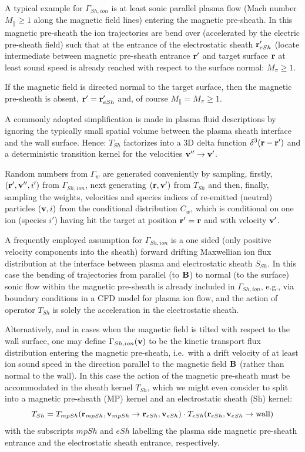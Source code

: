 A typical example for $\Gamma_{Sh,ion}$ is at least sonic parallel plasma flow
(Mach number $M_\|\geq 1$ along the magnetic field lines) entering the magnetic
pre-sheath.
In this magnetic pre-sheath the ion trajectories are bend over (accelerated by
the electric pre-sheath field) such that at the entrance of the electrostatic
sheath $\mathbf{r}'_{eSh}$ (locate intermediate between magnetic pre-sheath entrance
$\mathbf{r} '$ and target surface $\mathbf{r}$ at least sound speed is already reached with
respect to the surface normal: $M_\pi\geq 1$.

If the magnetic field is directed normal to the target surface, then the
magnetic pre-sheath is absent, $\mathbf{r}' = \mathbf{r}'_{eSh}$  and, of course $M_\| =
  M_\pi \geq 1$.

A commonly adopted simplification is made in plasma fluid descriptions by
ignoring the typically small spatial volume between the plasma sheath interface
and the wall surface.
Hence: $T_{Sh}$ factorizes into a 3D delta function $\delta^3(\mathbf{r}-\mathbf{r}')$ and a
deterministic transition kernel for the velocities $\mathbf{v}'' \rightarrow \mathbf{v}'$.

Random numbers from $\Gamma_w$ are generated conveniently by sampling, firstly,
$(\mathbf{r} ', \mathbf{v}  '', i ' ) $ from $\Gamma_{Sh,ion}$, next generating $(\mathbf{r}, \mathbf{v} '
  ) $ from $T_{Sh}$ and then, finally, sampling the weights, velocities and
species indices of re-emitted (neutral) particles $(\mathbf{v}, i)$ from the
conditional distribution $C_w $, which is conditional on one ion (species $i'$)
having hit the target at position $\mathbf{r}' = \mathbf{r}$ and with velocity $\mathbf{v} '$.

A frequently employed assumption for $\Gamma_{Sh,ion}$ is a one sided (only
positive velocity components into the sheath) forward drifting Maxwellian ion
flux distribution at the interface between plasma and electrostatic sheath
$S_{Sh}$.
In this case the bending of trajectories from parallel (to $\mathbf{B}$) to normal (to
the surface) sonic flow within the magnetic pre-sheath is already included in
$\Gamma_{Sh,ion}$, e.g., via boundary conditions in a \ac{CFD} model for plasma
ion flow, and the action of operator $T_{Sh}$ is solely the acceleration in the
electrostatic sheath.

Alternatively, and in cases when the magnetic field is tilted with respect to
the wall surface, one may define $\Gamma_{Sh,ion}(\mathbf{v})$ to be the kinetic
transport flux distribution entering the magnetic pre-sheath, i.e.\ with a
drift velocity of at least ion sound speed in the direction parallel to the
magnetic field $\mathbf{B}$ (rather than normal to the wall).
In this case the action of the magnetic pre-sheath must be accommodated in the
sheath kernel $T_{Sh}$, which we might even consider to split into a magnetic
pre-sheath (MP) kernel and an electrostatic sheath (Sh) kernel:
\begin{equation}
  T_{Sh} = T_{mpSh}(\mathbf{r}_{mpSh}, \mathbf{v}_{mpSh} \rightarrow \mathbf{r}_{eSh}, \mathbf{v}_{eSh})
  \cdot  T_{eSh}(\mathbf{r}_{eSh},\mathbf{v}_{eSh} \rightarrow \mbox{wall})
\end{equation}
with
the subscripts $mpSh$ and $eSh$ labelling the plasma side magnetic pre-sheath
entrance and the electrostatic sheath entrance, respectively.


